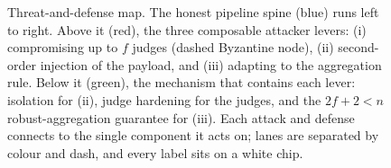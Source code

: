 \begin{figure}[t]
{}
\caption{Threat-and-defense map. The honest pipeline spine (blue) runs left to right. Above
it (red), the three composable attacker levers: (i) compromising up to $f$ judges (dashed
Byzantine node), (ii) second-order injection of the payload, and (iii) adapting to the
aggregation rule. Below it (green), the mechanism that contains each lever: isolation for
(ii), judge hardening for the judges, and the $2f{+}2<n$ robust-aggregation guarantee for
(iii). Each attack and defense connects to the single component it acts on; lanes are
separated by colour and dash, and every label sits on a white chip.}
\label{fig:threat}
\end{figure}
